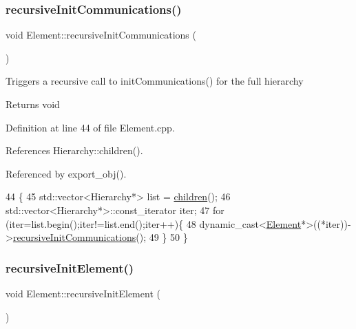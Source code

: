\subsubsection{\texorpdfstring{recursive\+Init\+Communications()}{recursiveInitCommunications()}}
{\footnotesize\ttfamily void Element\+::recursive\+Init\+Communications (\begin{DoxyParamCaption}{ }\end{DoxyParamCaption})\hspace{0.3cm}{\ttfamily [inherited]}}

Triggers a recursive call to init\+Communications() for the full hierarchy

\begin{DoxyReturn}{Returns}
void 
\end{DoxyReturn}


Definition at line 44 of file Element.\+cpp.



References Hierarchy\+::children().



Referenced by export\+\_\+obj().


\begin{DoxyCode}
44                                          \{
45   std::vector<Hierarchy*> list = \hyperlink{classHierarchy_aa9a76f69e98e052ee1a6e32cea006288}{children}();
46   std::vector<Hierarchy*>::const\_iterator iter;
47   \textcolor{keywordflow}{for} (iter=list.begin();iter!=list.end();iter++)\{
48     \textcolor{keyword}{dynamic\_cast<}\hyperlink{classElement}{Element}*\textcolor{keyword}{>}((*iter))->\hyperlink{classElement_a82119ed37dff76508a2746a853ec35ba}{recursiveInitCommunications}();
49   \}
50 \}
\end{DoxyCode}
\mbox{\label{classElement_a3c0abcb36f8906688bb7e32608df7086}} 
\subsubsection{\texorpdfstring{recursive\+Init\+Element()}{recursiveInitElement()}}
{\footnotesize\ttfamily void Element\+::recursive\+Init\+Element (\begin{DoxyParamCaption}{ }\end{DoxyParamCaption})\hspace{0.3cm}{\ttfamily [inherited]}}


